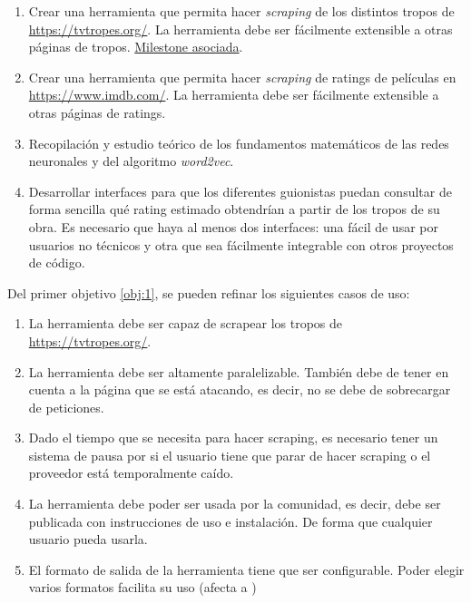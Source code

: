\begin{enumerate}
      \item \label{obj:1} Crear una herramienta que permita hacer \textit{scraping} de los distintos
            tropos de \url{https://tvtropes.org/}. La herramienta debe ser fácilmente extensible a
            otras páginas de tropos. \href{https://github.com/antoniogamiz/tfg/milestone/3}{Milestone asociada}.
      \item \label{obj:2} Crear una herramienta que permita hacer \textit{scraping} de ratings de
            películas en \url{https://www.imdb.com/}. La herramienta debe ser fácilmente extensible a
            otras páginas de ratings.
      \item \label{obj:3} Recopilación y estudio teórico de los fundamentos matemáticos de las redes
            neuronales y del algoritmo \textit{word2vec}.
      \item \label{obj:4} Desarrollar interfaces para que los diferentes guionistas puedan consultar
            de forma sencilla qué rating estimado obtendrían a partir de los tropos de su obra. Es necesario
            que haya al menos dos interfaces: una fácil de usar por usuarios no técnicos y otra que sea
            fácilmente integrable con otros proyectos de código.
\end{enumerate}

Del primer objetivo \ref{obj:1}, se pueden refinar los siguientes casos de uso:

\begin{enumerate}
      \item \label{us:1} La herramienta debe ser capaz de scrapear los tropos de \url{https://tvtropes.org/}.
      \item \label{us:2} La herramienta debe ser altamente paralelizable. También debe de tener en
            cuenta a la página que se está atacando, es decir, no se debe de sobrecargar de peticiones.
      \item \label{us:3} Dado el tiempo que se necesita para hacer scraping, es necesario tener un
            sistema de pausa por si el usuario tiene que parar de hacer scraping o el proveedor está
            temporalmente caído.
      \item \label{us:4} La herramienta debe poder ser usada por la comunidad, es decir, debe ser
            publicada con instrucciones de uso e instalación. De forma que cualquier usuario pueda usarla.
      \item \label{us:5} El formato de salida de la herramienta tiene que ser configurable. Poder elegir
            varios formatos facilita su uso (afecta a \label{us:4})
\end{enumerate}